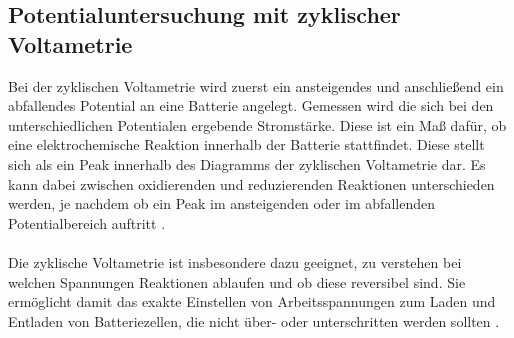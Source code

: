 \documentclass[a4paper, 11pt, headsepline,footsepline,twoside,abstract]{scrbook}
\begin{document}
\subsection{Potentialuntersuchung mit zyklischer Voltametrie}
Bei der zyklischen Voltametrie wird zuerst ein ansteigendes und anschließend ein abfallendes Potential an eine Batterie angelegt. Gemessen wird die sich bei den unterschiedlichen Potentialen ergebende Stromstärke. Diese ist ein Maß dafür, ob eine elektrochemische Reaktion innerhalb der Batterie stattfindet. Diese stellt sich als ein Peak innerhalb des Diagramms der zyklischen Voltametrie dar. Es kann dabei zwischen oxidierenden und reduzierenden Reaktionen unterschieden werden, je nachdem ob ein Peak im ansteigenden oder im abfallenden Potentialbereich auftritt \cite{Hamann2005}.
\\\\
Die zyklische Voltametrie ist insbesondere dazu geeignet, zu verstehen bei welchen Spannungen Reaktionen ablaufen und ob diese reversibel sind. Sie ermöglicht damit das exakte Einstellen von Arbeitsspannungen zum Laden und Entladen von Batteriezellen, die nicht über- oder unterschritten werden sollten \cite{Linden2011}.
\end{document}
